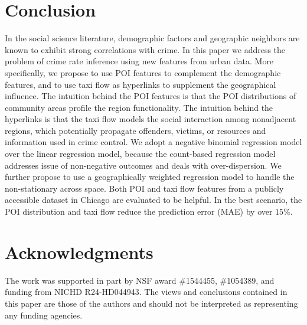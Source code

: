 
\section{Conclusion}
\label{sec:conclusion}

In the social science literature, demographic factors and geographic neighbors are known to exhibit strong correlations with crime.
In this paper we address the problem of crime rate inference using new features from urban data. More specifically, we propose to use POI features to complement the demographic features, and to use taxi flow as hyperlinks to supplement the geographical influence. The intuition behind the POI features is that the POI distributions of community areas profile the region functionality. The intuition behind the hyperlinks is that the taxi flow models the social interaction among nonadjacent regions, which potentially propagate offenders, victims, or resources and information used in crime control. We adopt a negative binomial regression model over the linear regression model, because the count-based regression model addresses issue of non-negative outcomes and deals with over-dispersion. We further propose to use a geographically weighted regression model to handle the non-stationary across space. Both POI and taxi flow features from a publicly accessible dataset in Chicago are evaluated to be helpful. In the best scenario, the POI distribution and taxi flow reduce the prediction error (MAE) by over $15\%$. 


\section{Acknowledgments}


The work was supported in part by NSF award \#1544455, \#1054389, and funding from NICHD R24-HD044943. The views and conclusions contained in this paper are those of the authors and should not be interpreted as representing any funding agencies.
